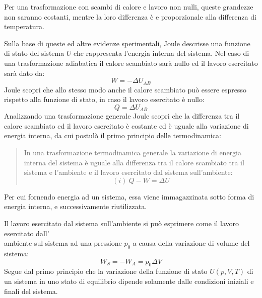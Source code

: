 \documentclass{article}
\numberwithin{equation}{subsection}
\begin{document}
Per una trasformazione con scambi di calore e lavoro non nulli, queste grandezze non saranno costanti, mentre la loro differenza è e proporzionale alla differenza 
di temperatura.  



Sulla base di queste ed altre evidenze sperimentali, Joule 
descrisse una funzione di stato del sistema $U$ che 
rappresenta l'energia interna del sistema. Nel caso di una 
trasformazione adiabatica il calore scambiato sarà nullo ed il 
lavoro esercitato sarà dato da:
\begin{equation}
    W=-\Delta U_{AB}
\end{equation}
Joule scoprì che allo stesso modo anche il calore scambiato 
può essere espresso 
rispetto alla funzione di stato, in caso il lavoro esercitato 
è nullo:
\begin{equation}
    Q=\Delta U_{AB}
\end{equation}
Analizzando una trasformazione generale Joule scoprì che 
la differenza tra il calore scambiato ed il lavoro esercitato è 
costante ed è uguale alla variazione di energia interna, da cui 
postulò il primo principio delle termodinamica:
\begin{quotation}
    In una trasformazione termodinamica generale la variazione 
    di energia interna del sistema è uguale alla differenza tra 
    il calore scambiato tra il sistema e l'ambiente e il lavoro 
    esercitato dal sistema sull'ambiente:
    \begin{equation*}
     (i)\:   Q-W=\Delta U
    \end{equation*}
\end{quotation}
Per cui fornendo energia ad un sistema, essa viene immagazzinata sotto forma di energia interna, e successivamente riutilizzata. 



Il lavoro esercitato dal sistema sull'ambiente si può 
esprimere come il lavoro esercitato dall'\\ambiente sul sistema 
ad una pressione $p_0$ a causa della variazione di volume 
del sistema:
\begin{equation*}
    W_S=-W_A=p_0\Delta V
\end{equation*}
Segue dal primo principio che la 
variazione della funzione di stato $U(p,V,T)$ di un sistema in uno stato 
di equilibrio dipende solamente dalle condizioni iniziali e 
finali del sistema. 
\end{document}
